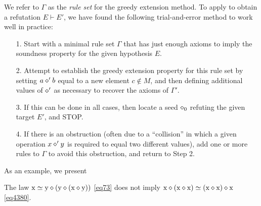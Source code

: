 We refer to $\Gamma$ as the \emph{rule set} for the greedy extension method. To apply  to obtain a refutation $E \vdash E'$, we have found the following trial-and-error method to work well in practice:
\begin{itemize}
\item[1.] Start with a minimal rule set $\Gamma$ that has just enough axioms to imply the soundness property for the given hypothesis $E$.
\item[2.] Attempt to establish the greedy extension property for this rule set by setting $a \diamond' b$ equal to a new element $c \not \in M$, and then defining additional values of $\diamond'$ as necessary to recover the axioms of $\Gamma'$.
\item[3.]  If this can be done in all cases, then locate a seed $\diamond_0$ refuting the given target $E'$, and STOP.
\item[4.]  If there is an obstruction (often due to a ``collision'' in which a given operation $x \diamond' y$ is required to equal two different values), add one or more rules to $\Gamma$ to avoid this obstruction, and return to Step 2.
\end{itemize}

As an example, we present

\begin{proposition}\label{73-4380} The law $\mathrm{x} \simeq \mathrm{y} \diamond (\mathrm{y} \diamond (\mathrm{x} \diamond \mathrm{y}))$ \eqref{eq73} does not imply $\mathrm{x} \diamond (\mathrm{x} \diamond \mathrm{x}) \simeq (\mathrm{x} \diamond \mathrm{x}) \diamond \mathrm{x}$ \eqref{eq4380}.
\end{proposition}

